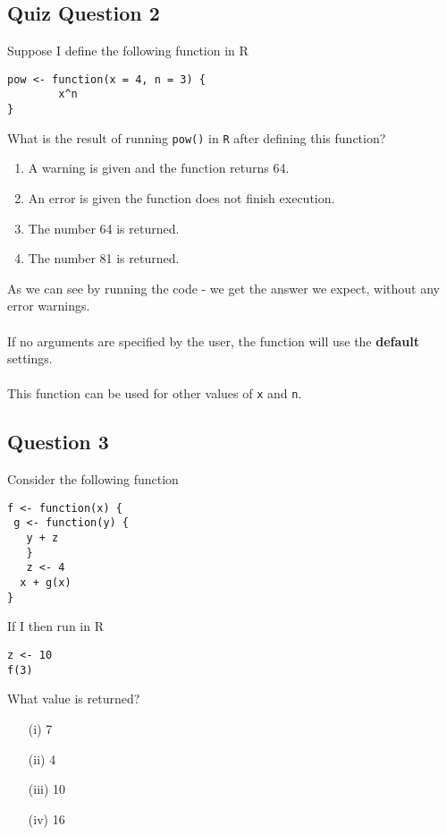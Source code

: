\documentclass[]{article}
\begin{document}
\subsection*{Quiz Question 2}
Suppose I define the following function in R
\begin{framed}
\begin{verbatim}
pow <- function(x = 4, n = 3) {
        x^n
}
\end{verbatim}
\end{framed}
What is the result of running
\texttt{pow()}
in \texttt{R} after defining this function?
\begin{enumerate}
\item A warning is given and the function returns 64.
\item An error is given the function does not finish execution.
\item The number 64 is returned.
\item The number 81 is returned.
\end{enumerate}

As we can see by running the code - we get the answer we expect, without any error warnings. \\ \\ If no arguments are specified by the user, the function will use the \textbf{default} settings. \\ \\ This function can be used for other values of \texttt{x} and \texttt{n}.

\newpage

\subsection*{Question 3}
Consider the following function
\begin{framed}
\begin{verbatim}
f <- function(x) {
 g <- function(y) {
   y + z
   }
   z <- 4
  x + g(x)
}

\end{verbatim}
\end{framed}
If I then run in R
\begin{verbatim}
z <- 10
f(3)
\end{verbatim}
What value is returned?
\begin{itemize}
\item[(i)] 7
\item[(ii)] 4
\item[(iii)]10
\item[(iv)]16
\end{itemize}
\newpage
\end{document}
